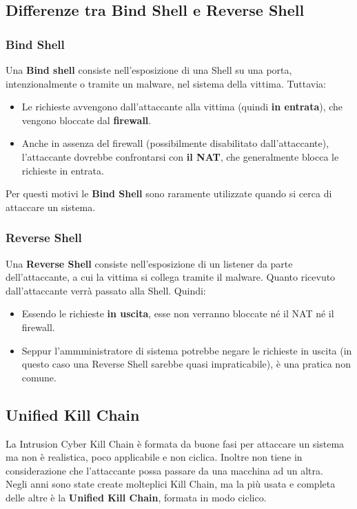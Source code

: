 \documentclass{article}
\begin{document}
\subsection{Differenze tra Bind Shell e Reverse Shell}
\subsubsection{Bind Shell}
Una \textbf{Bind shell} consiste nell'esposizione di una Shell su una porta, intenzionalmente o tramite un malware, nel sistema della vittima. Tuttavia:
\begin{itemize}
    \item Le richieste avvengono dall'attaccante alla vittima (quindi \textbf{in entrata}), che vengono bloccate dal \textbf{firewall}.
    \item Anche in assenza del firewall (possibilmente disabilitato dall'attaccante), l'attaccante dovrebbe confrontarsi con \textbf{il NAT}, che generalmente blocca le richieste in entrata.
\end{itemize}

Per questi motivi le \textbf{Bind Shell} sono raramente utilizzate quando si cerca di attaccare un sistema.
\newpage
\subsubsection{Reverse Shell}
Una \textbf{Reverse Shell} consiste nell'esposizione di un listener da parte dell'attaccante, a cui la vittima si collega tramite il malware. Quanto ricevuto dall'attaccante verrà passato alla Shell. Quindi:
\begin{itemize}
    \item Essendo le richieste \textbf{in uscita}, esse non verranno bloccate né il NAT né il firewall.
    \item Seppur l'ammministratore di sistema potrebbe negare le richieste in uscita (in questo caso una Reverse Shell sarebbe quasi impraticabile), è una pratica non comune.
\end{itemize}

\subsection{Unified Kill Chain}
La Intrusion Cyber Kill Chain è formata da buone fasi per attaccare un sistema ma non è realistica, poco applicabile e non ciclica. Inoltre non tiene in considerazione che l'attaccante possa passare da una macchina ad un altra.\\
Negli anni sono state create molteplici Kill Chain, ma la più usata e completa delle altre è la \textbf{Unified Kill Chain}, formata in modo ciclico.
\end{document}

